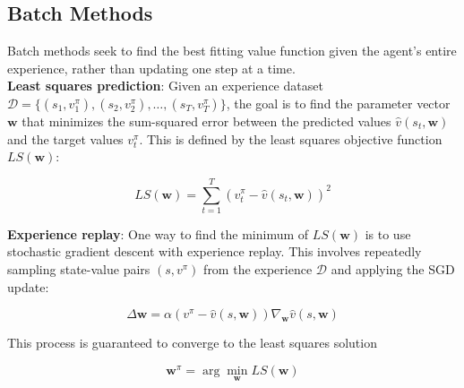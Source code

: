 \subsection{Batch Methods}

Batch methods seek to find the best fitting value function given the agent's
entire experience, rather than updating one step at a time. \\

\noindent \textbf{Least squares prediction}: Given an experience dataset
$\mathcal{D} = \{(s_1, v_1^\pi), (s_2, v_2^\pi), \dots, (s_T, v_T^\pi)\}$,
the goal is to find the parameter vector $\mathbf{w}$ that minimizes the
sum-squared error between the predicted values $\hat{v}(s_t, \mathbf{w})$
and the target values $v_t^\pi$. This is defined by the least squares objective
function $LS(\mathbf{w})$:

\begin{equation*}
    LS(\mathbf{w}) = \sum_{t=1}^T (v_t^\pi - \hat{v}(s_t, \mathbf{w}))^2
\end{equation*}

\noindent \textbf{Experience replay}: One way to find the minimum of
$LS(\mathbf{w})$ is to use stochastic gradient descent with experience replay.
This involves repeatedly sampling state-value pairs $(s, v^\pi)$ from the
experience $\mathcal{D}$ and applying the SGD update:

\begin{equation*}
    \Delta \mathbf{w} = \alpha (v^\pi - \hat{v}(s, \mathbf{w})) \nabla_\mathbf{w} \hat{v}(s, \mathbf{w})
\end{equation*}

\noindent This process is guaranteed to converge to the least squares solution

\begin{equation*}
    \mathbf{w}^\pi = \arg\min_\mathbf{w} LS(\mathbf{w})
\end{equation*}

